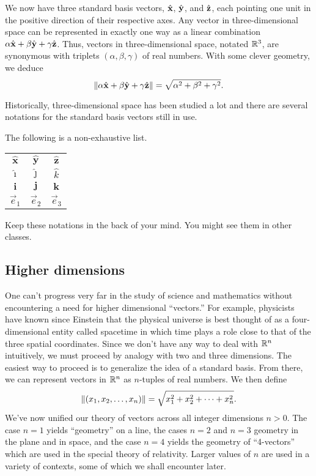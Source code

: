 We now have three standard basis vectors, ${\hat {\mathbf x}}$, ${\hat {\mathbf y}}$,
and ${\hat {\mathbf z}}$, each pointing one unit in the positive direction of their
respective axes.
Any vector in three-dimensional
space can be represented 
in exactly one way
as a linear combination $\alpha{\hat {\mathbf x}}+\beta{\hat {\mathbf y}}+\gamma{\hat {\mathbf z}}$.  Thus,
vectors in three-dimensional space, notated $\mathbb{R}^3$,
are synonymous with triplets $(\alpha,\beta,\gamma)$
of real numbers.  With some clever geometry, we deduce
\[
	\lVert\alpha{\hat {\mathbf x}}+\beta{\hat {\mathbf y}}+\gamma{\hat {\mathbf z}}\rVert=\sqrt{\alpha^2+\beta^2+\gamma^2}.
\]

Historically, three-dimensional space has been studied a lot and there
are several notations for the standard basis vectors still in use.

The following is a non-exhaustive list.
\begin{center}
	\begin{tabular}{c  c  c}
		$\hat{\mathbf{x}}$ & $\hat{\mathbf{y}}$ &$\hat{\mathbf{z}}$\\
		$\hat{\imath}$ & $\hat{\jmath}$ &$\hat{k}$\\
		$\mathbf{i}$ & $\mathbf j$ & $\mathbf k$\\
		$\vec e_1$ & $\vec e_2$ & $\vec e_3$
	\end{tabular}
\end{center}
Keep these notations in the back of your mind.  You might see them in other classes.

\subsection{Higher dimensions}
One can't progress very far in the study of science and mathematics
without encountering a need for higher dimensional ``vectors.''  For
example, physicists have known since Einstein that the physical
universe is best thought of as a four-dimensional entity called
spacetime in which time plays a role close to that of the 
three spatial coordinates.  Since we don't have any way to deal with
$\mathbb{R}^n$
intuitively, we must
proceed by analogy with two and three dimensions.
The easiest
way to proceed is to generalize the idea of a standard basis.
From there, we can represent vectors in $\mathbb{R}^n$ as $n$-tuples of real numbers.
We then define
\[
	\lVert(x_1,x_2,\ldots,x_n)\rVert = \sqrt{x_1^2+x_2^2+\cdots+x_n^2}.	
\]
We've now unified our theory of vectors across all integer dimensions $n>0$.
The case $n=1$ yields  ``geometry'' on a line, 
the cases $n = 2$ and $n = 3$ geometry in the plane and in space, and
the case $n = 4$ yields the geometry of ``4-vectors'' which
are  used in the special theory of relativity.
Larger values of $n$ are used in a
variety of contexts, some of which we shall encounter later.


